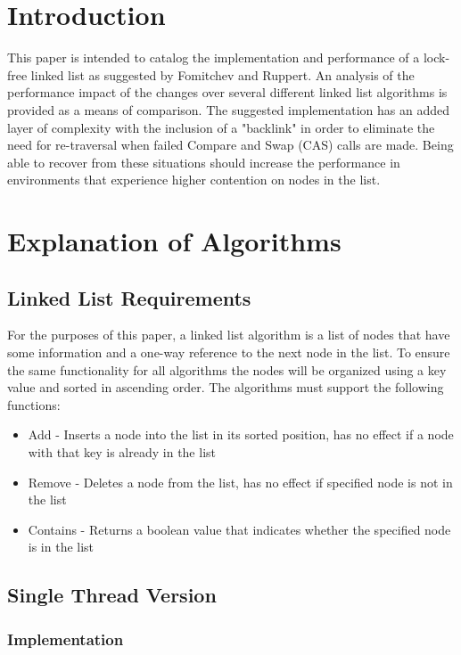\section{Introduction}
This paper is intended to catalog the implementation and performance of a lock-free linked list as suggested by Fomitchev and Ruppert. An analysis of the performance impact of the changes over several different linked list algorithms is provided as a means of comparison. The suggested implementation has an added layer of complexity with the inclusion of a "backlink" \cite[pg 52]{Fomitchev:2004:LLL:1011767.1011776} in order to eliminate the need for re-traversal when failed Compare and Swap (CAS) calls are made. Being able to recover from these situations should increase the performance in environments that experience higher contention on nodes in the list. 

\section{Explanation of Algorithms}


\subsection{Linked List Requirements}
For the purposes of this paper, a linked list algorithm is a list of nodes that have some information and a one-way reference to the next node in the list. To ensure the same functionality for all algorithms the nodes will be organized using a key value and sorted in ascending order. The algorithms must support the following functions:
\begin{itemize}
\item Add - Inserts a node into the list in its sorted position, has no effect if a node with that key is already in the list
\item Remove - Deletes a node from the list, has no effect if specified node is not in the list
\item Contains - Returns a boolean value that indicates whether the specified node is in the list
\end{itemize}

\subsection{Single Thread Version}
\subsubsection{Implementation}

